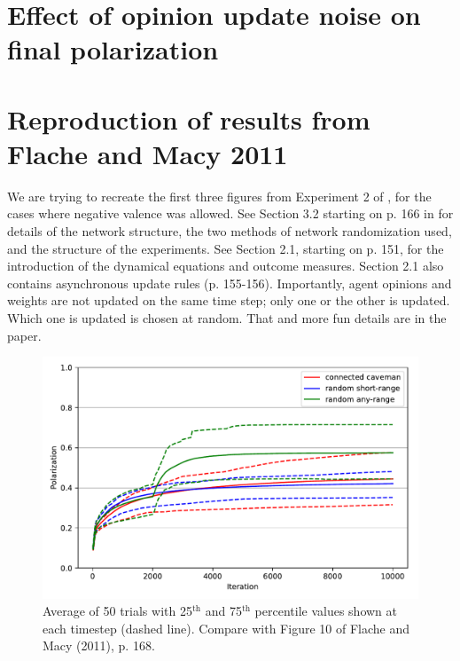 \documentclass[11pt,letterpaper]{article}
\begin{document}
\section{Effect of opinion update noise on final polarization}


\section{Reproduction of results from Flache and Macy 2011}
\label{sec:label}

We are trying to recreate the first three figures from Experiment 2 of 
, for the cases where negative valence was allowed.
See Section 3.2 starting on p. 166 in  for details of the
network structure, the two methods of network randomization used, and 
the structure of the experiments. See Section 2.1, starting on p. 151, for 
the introduction of the dynamical equations and outcome measures. Section 2.1
also contains asynchronous update rules (p. 155-156). Importantly, agent opinions
and weights are not updated on the same time step; only one or the other is
updated. Which one is updated is chosen at random. That and more fun details
are in the paper.

\begin{figure}
\begin{center}
  \includegraphics[width=\textwidth]{Figures/figure10b.pdf}
\end{center}
  \caption{Average of 50 trials with 25$^{\mathrm{th}}$ and 75$^{\mathrm{th}}$ 
    percentile values shown at each timestep (dashed line). Compare with
    Figure 10 of Flache and Macy (2011), p. 168.}
\label{fig:figure10-reproduction}
\end{figure}
\end{document}
